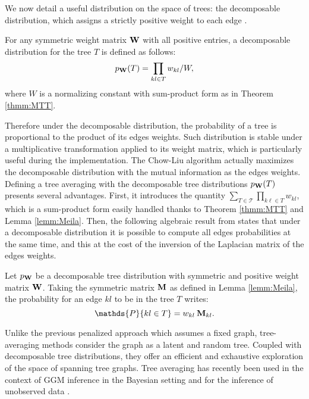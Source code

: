 We now detail a useful distribution on the space of trees: the decomposable distribution, which assigns a strictly positive weight to each edge  \citep{MixtTrees,MeilaJaak}.
\begin{definition} \label{decompdistrib}
For any symmetric weight matrix ${\bf W}$ with all positive entries, a decomposable  distribution for the tree $T$ is defined as follows:
$$p_{{\bf W}}(T) = \prod_{kl \in T} w_{kl} / W ,$$
where  $W$ is a normalizing constant with sum-product form as in Theorem \ref{thmm:MTT}.
\end{definition}
Therefore  under the decomposable distribution, the probability of a tree is proportional to the product of its edges weights. Such distribution is stable under a multiplicative transformation applied to its weight matrix, which is particularly useful during the implementation. The Chow-Liu algorithm actually maximizes the decomposable distribution with the mutual information as the edges weights.\\

Defining a tree averaging  with the decomposable tree distributions $p_{{\bf W}}(T)$ presents several advantages. First, it introduces the quantity $\sum_{T\in\mathcal{T}}\prod_{k\ell\in T} w_{kl}$, which is a sum-product form easily handled thanks to Theorem \ref{thmm:MTT} and Lemma \ref{lemm:Meila}. Then, the following algebraic result from \cite{kirshner} states that under a decomposable distribution it is possible to compute all edges probabilities at the same time, and this at the cost of the inversion of the  Laplacian matrix of the edges weights.

\begin{lemma}  \label{lem:Kirshner}
    Let $p_{{\bf W}}$ be a decomposable tree distribution with symmetric and positive weight matrix ${\bf W}$. Taking the symmetric matrix ${\bf M}$ as defined in Lemma  \ref{lemm:Meila}, the probability for an edge $kl$ to be in the tree $T$ writes:
$$\mathds{P}\{kl\in T\} =  w_{kl}\: \Mbf_{kl}.$$
\end{lemma}

Unlike the previous penalized approach which assumes a fixed graph, tree-averaging methods consider the graph as a latent and random tree. Coupled with decomposable tree distributions, they offer an efficient and exhaustive exploration of the space of spanning tree graphs. Tree averaging has recently been used in the context of GGM inference in the Bayesian setting \citep{SRS19} and for the inference of unobserved data \citep{RAR19}.



